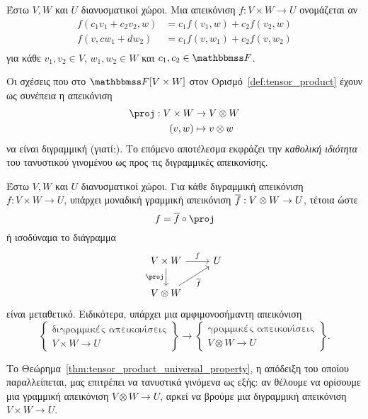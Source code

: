 \documentclass[12pt,a4paper,reqno]{amsart}
\newcommand{\defn}[1]{{\color{mylightblue}{#1}}}
\begin{document}
\begin{definition}
    \label{def:bilinear}
    Έστω $V, W$ και $U$ διανυσματικοί χώροι. Μια απεικόνιση $f: V\times W \to U$ ονομάζεται \defn{διγραμμική} αν 
    \begin{align*}
        f(c_1v_1 + c_2v_2, w) &= c_1f(v_1,w) + c_2f(v_2,w) \\
        f(v, cw_1+dw_2) &= c_1f(v,w_1) + c_2f(v,w_2) \\
    \end{align*}
    για κάθε $v_1, v_2 \in V$, $w_1, w_2 \in W$ και $c_1, c_2 \in \FF$.
\end{definition}

Οι σχέσεις που  στο $\FF[V\times{W}]$ στον Ορισμό~\ref{def:tensor_product} έχουν ως συνέπεια η απεικόνιση
\begin{align*}
\proj : V \times W &\to V \otimes W \\
(v,w) &\mapsto v \otimes w
\end{align*}
να είναι διγραμμική (γιατί;). Το επόμενο αποτέλεσμα εκφράζει την \emph{καθολική ιδιότητα} του τανυστικού γινομένου ως προς τις διγραμμικές απεικονίσης.
\begin{theorem}
    \label{thm:tensor_product_universal_property}
    Έστω $V, W$ και $U$ διανυσματικοί χώροι. Για κάθε διγραμμική απεικόνιση $f: V \times W \to U$, υπάρχει μοναδική γραμμική απεικόνιση $\overline{f}: V \otimes W \rightarrow U$, τέτοια ώστε
    \[
    f = \ol{f} \circ \proj
    \]
    ή ισοδύναμα το διάγραμμα
    \[
    \begin{tikzcd}
    V\times W \arrow[r, "f"] \arrow[d, "\proj"'] & U \\
    V \otimes W   \arrow[ur, "\ol{f}"']          & 
    \end{tikzcd}
    \]
    είναι μεταθετικό. Ειδικότερα, υπάρχει μια αμφιμονοσήμαντη απεικόνιση 
    \[
    \left\{
        \begin{array}{c}
        \text{διγραμμικές απεικονίσεις} \\
        V \times W \to U
    \end{array}
    \right\} 
    \to
    \left\{
    \begin{array}{c}
        \text{γραμμικές απεικονίσεις} \\
        V \otimes W \to U
    \end{array}
    \right\}.    
    \]
\end{theorem}

Το Θεώρημα~\ref{thm:tensor_product_universal_property}, η απόδειξη του οποίου παραλλείπεται, μας επιτρέπει να  τανυστικά γινόμενα ως εξής: αν θέλουμε να ορίσουμε μια γραμμική απεικόνιση $V\otimes{W} \to U$, αρκεί να βρούμε μια διγραμμική απεικόνιση $V\times{W} \to U$.
\end{document}
